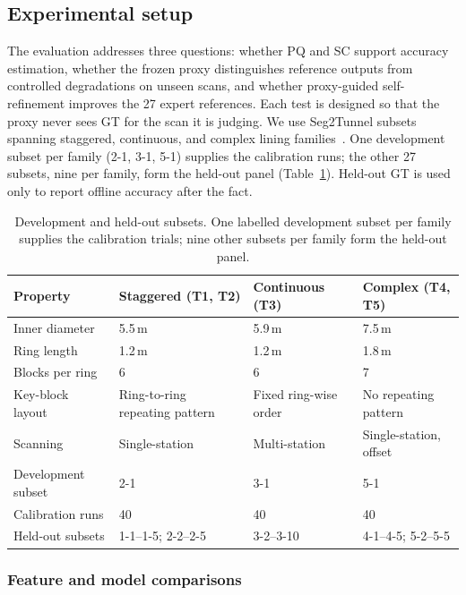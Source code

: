 \documentclass[a4paper,fleqn]{cas-dc}
\begin{document}
{\subsection{Experimental setup}
\label{sec:exp-setup}
The evaluation addresses three questions: whether PQ and SC support accuracy estimation, whether the frozen proxy distinguishes reference outputs from controlled degradations on unseen scans, and whether proxy-guided self-refinement improves the 27 expert references. Each test is designed so that the proxy never sees GT for the scan it is judging. We use Seg2Tunnel subsets spanning staggered, continuous, and complex lining families~\cite{lin2024seg2tunnel}. One development subset per family (2-1, 3-1, 5-1) supplies the calibration runs; the other 27 subsets, nine per family, form the held-out panel (Table~\ref{tab:dataset}). Held-out GT is used only to report offline accuracy after the fact.\label{sec:dataset}

\begin{table}[t]
\caption{Development and held-out subsets. One labelled development subset per family supplies the calibration trials; nine other subsets per family form the held-out panel.}
\label{tab:dataset}
\centering
\begin{tabular}{p{} p{} p{} p{}}
\toprule
Property & Staggered (T1, T2) & Continuous (T3) & Complex (T4, T5) \\
\midrule
Inner diameter & 5.5\,m & 5.9\,m & 7.5\,m \\
Ring length & 1.2\,m & 1.2\,m & 1.8\,m \\
Blocks per ring & 6 & 6 & 7 \\
Key-block layout & Ring-to-ring repeating pattern & Fixed ring-wise order & No repeating pattern \\
Scanning & Single-station & Multi-station & Single-station, offset \\
Development subset & 2-1 & 3-1 & 5-1 \\
Calibration runs & 40 & 40 & 40 \\
Held-out subsets & 1-1--1-5; 2-2--2-5 & 3-2--3-10 & 4-1--4-5; 5-2--5-5 \\
\bottomrule
\end{tabular}
\end{table}


\subsubsection{Feature and model comparisons}
\label{sec:comparators}

}
\end{document}
